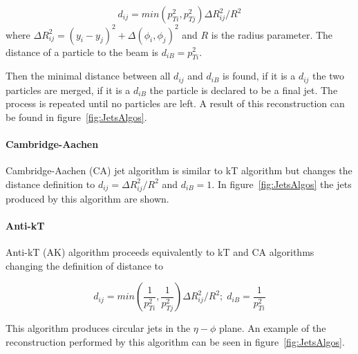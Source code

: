 \begin{equation}
  \label{eq:kt}
  d_{ij}=min(p_{Ti}^{2},p_{Tj}^{2})\Delta R_{ij}^{2}/R^{2}
\end{equation} where $\Delta R_{ij}^{2}=(y_{i}-y_{j})^{2}+\Delta(\phi_{i},\phi_{j})^{2}$ and $R$ is the radius parameter. The distance of a particle to the beam is $d_{iB}=p_{Ti}^{2}$. 

Then the minimal distance between all $d_{ij}$ and $d_{iB}$ is found, if it is a $d_{ij}$ the two particles are merged, if it is a $d_{iB}$ the particle is declared to be a final jet. The process is repeated until no particles are left. A result of this reconstruction can be found in figure~\ref{fig:JetsAlgos}. 

\paragraph{Cambridge-Aachen}

Cambridge-Aachen (CA) jet algorithm is similar to kT algorithm but changes the distance definition to $d_{ij}=\Delta R_{ij}^{2}/R^{2}$ and $d_{iB}=1$. In figure~\ref{fig:JetsAlgos} the jets produced by this algorithm are shown.

\paragraph{Anti-kT}

Anti-kT (AK) algorithm proceeds equivalently to kT and CA algorithms changing the definition of distance to

\begin{equation}
  \label{eq:antikt}
  d_{ij}=min\left(\frac{1}{p_{Ti}^{2}},\frac{1}{p_{Tj}^{2}}\right)\Delta R_{ij}^{2}/R^{2};\; d_{iB}=\frac{1}{p_{Ti}^{2}}
\end{equation} 

This algorithm produces circular jets in the $\eta-\phi$ plane. An example of the reconstruction performed by this algorithm can be seen in figure~\ref{fig:JetsAlgos}.

